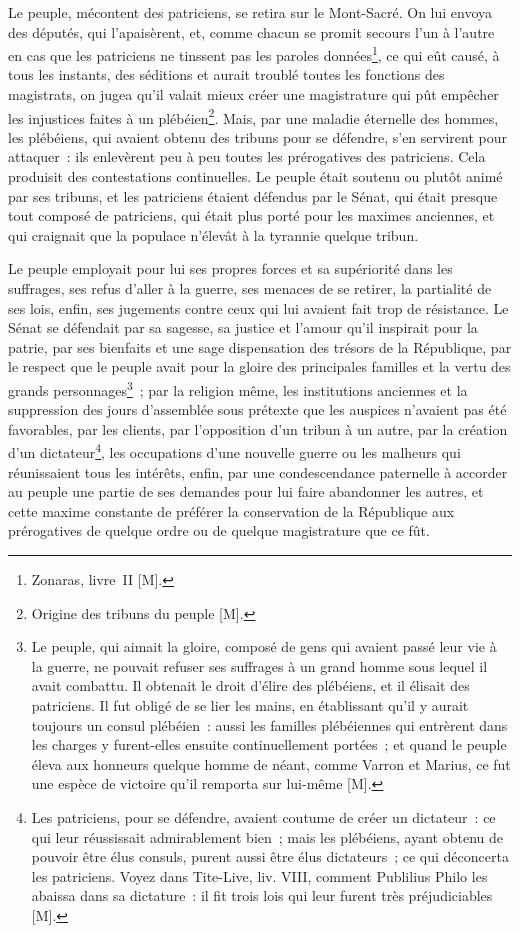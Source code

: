 \documentclass[french,twoside]{book} %
\begin{document}
Le peuple, mécontent des patriciens, se retira sur le Mont-Sacré. On lui envoya des députés, qui l’apaisèrent, et, comme chacun se promit secours l’un à l’autre en cas que les patriciens ne tinssent pas les paroles données\footnote{Zonaras, livre II [M].}, ce qui eût causé, à tous les instants, des séditions et aurait troublé toutes les fonctions des magistrats, on jugea qu’il valait mieux créer une magistrature qui pût empêcher les injustices faites à un plébéien\footnote{Origine des tribuns du peuple [M].}. Mais, par une maladie éternelle des hommes, les plébéiens, qui avaient obtenu des tribuns pour se défendre, s’en servirent pour attaquer : ils enlevèrent peu à peu toutes les prérogatives des patriciens. Cela produisit des contestations continuelles. Le peuple était soutenu ou plutôt animé par ses tribuns, et les patriciens étaient défendus par le Sénat, qui était presque tout composé de patriciens, qui était plus porté pour les maximes anciennes, et qui craignait que la populace n’élevât à la tyrannie quelque tribun.\par
Le peuple employait pour lui ses propres forces et sa supériorité dans les suffrages, ses refus d’aller à la guerre, ses menaces de se retirer, la partialité de ses lois, enfin, ses jugements contre ceux qui lui avaient fait trop de résistance. Le Sénat se défendait par sa sagesse, sa justice et l’amour qu’il inspirait pour la patrie, par ses bienfaits et une sage dispensation des trésors de la République, par le respect que le peuple avait pour la gloire des principales familles et la vertu des grands personnages\footnote{Le peuple, qui aimait la gloire, composé de gens qui avaient passé leur vie à la guerre, ne pouvait refuser ses suffrages à un grand homme sous lequel il avait combattu. Il obtenait le droit d’élire des plébéiens, et il élisait des patriciens. Il fut obligé de se lier les mains, en établissant qu’il y aurait toujours un consul plébéien : aussi les familles plébéiennes qui entrèrent dans les charges y furent-elles ensuite continuellement portées ; et quand le peuple éleva aux honneurs quelque homme de néant, comme Varron et Marius, ce fut une espèce de victoire qu’il remporta sur lui-même [M].} ; par la religion même, les institutions anciennes et la suppression des jours d’assemblée sous prétexte que les auspices n’avaient pas été favorables, par les clients, par l’opposition d’un tribun à un autre, par la création d’un dictateur\footnote{Les patriciens, pour se défendre, avaient coutume de créer un dictateur : ce qui leur réussissait admirablement bien ; mais les plébéiens, ayant obtenu de pouvoir être élus consuls, purent aussi être élus dictateurs ; ce qui déconcerta les patriciens. Voyez dans Tite-Live, liv. VIII, comment Publilius Philo les abaissa dans sa dictature : il fit trois lois qui leur furent très préjudiciables [M].}, les occupations d’une nouvelle guerre ou les malheurs qui réunissaient tous les intérêts, enfin, par une condescendance paternelle à accorder au peuple une partie de ses demandes pour lui faire abandonner les autres, et cette maxime constante de préférer la conservation de la République aux prérogatives de quelque ordre ou de quelque magistrature que ce fût.\par
\end{document}
